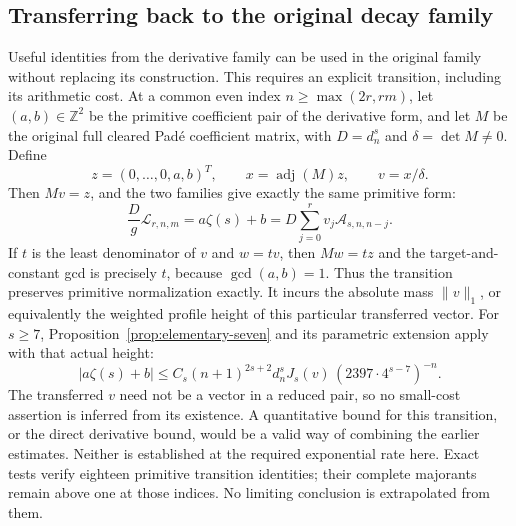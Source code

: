 \documentclass[11pt]{article}
\theoremstyle{remark}
\newcommand{\Z}{\mathbb Z}
\newcommand{\cA}{\mathcal A}
\begin{document}
\subsection{Transferring back to the original decay family}
Useful identities from the derivative family can be used in the original
family without replacing its construction. This requires an explicit
transition, including its arithmetic cost. At a common even index
\(n\ge\max(2r,rm)\), let \((a,b)\in\Z^2\) be the primitive coefficient
pair of the derivative form, and let \(M\) be the original full cleared
Pad\'e coefficient matrix, with \(D=d_n^s\) and \(\delta=\det M\ne0\).
Define
\[
 z=(0,\ldots,0,a,b)^T,\qquad
 x=\operatorname{adj}(M)z,\qquad v=x/\delta.
\]
Then \(Mv=z\), and the two families give exactly the same primitive form:
\begin{equation}
 \frac Dg\mathcal L_{r,n,m}
 =a\zeta(s)+b
 =D\sum_{j=0}^r v_j\cA_{s,n,n-j}.
 \label{eq:cross-family-transition}
\end{equation}
If \(t\) is the least denominator of \(v\) and \(w=tv\), then
\(Mw=tz\) and the target-and-constant gcd is precisely \(t\), because
\(\gcd(a,b)=1\). Thus the transition preserves primitive normalization
exactly. It incurs the absolute mass \(\|v\|_1\), or equivalently
the weighted profile height of this particular transferred vector.
For \(s\ge7\), Proposition~\ref{prop:elementary-seven} and its
parametric extension apply with that actual height:
\[
 |a\zeta(s)+b|
 \le C_s(n+1)^{2s+2}d_n^s
       J_s(v)\,(2397\cdot4^{s-7})^{-n}.
\]
The transferred \(v\) need not be a vector in a reduced pair, so no
small-cost assertion is inferred from its existence. A quantitative
bound for this transition, or the direct derivative bound, would be a
valid way of combining the earlier estimates. Neither is established
at the required exponential rate here. Exact tests verify eighteen
primitive transition identities; their complete majorants remain above
one at those indices. No limiting conclusion is extrapolated from them.
\end{document}
